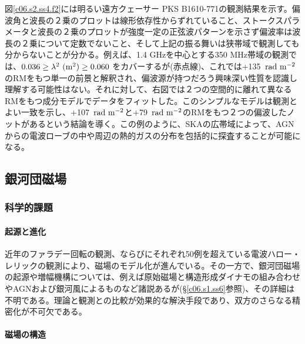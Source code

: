 図\ref{c06.s2.ss4.f2}には明るい遠方クェーサー PKS B1610-771の観測結果を示す\citep{2012MNRAS.421.3300O}。偏波角と波長の２乗のプロットは線形依存性からずれていること、ストークスパラメータと波長の２乗のプロットが強度一定の正弦波パターンを示さず偏波率は波長の２乗について定数でないこと、そして上記の振る舞いは狭帯域で観測しても分からないことが分かる。例えば、1.4 GHzを中心とする350 MHz帯域の観測\citep{2004NewAR..48.1003G, 2004NewAR..48.1289B}では、$0.036 \ge \lambda^2~({\rm m^2}) \ge 0.060$ をカバーするが(赤点線)、これでは+135~${\rm rad~m^{-2}}$のRMをもつ単一の前景と解釈され、偏波源が持つだろう興味深い性質を認識し理解する可能性はない。それに対して、右図では２つの空間的に離れて異なるRMをもつ成分モデルでデータをフィットした。このシンプルなモデルは観測とよい一致を示し、+107~${\rm rad~m^{-2}}$と+79~${\rm rad~m^{-2}}$のRMをもつ２つの偏波したノットがあるという結論を導く。この例のように、SKAの広帯域によって、AGNからの電波ローブの中や周辺の熱的ガスの分布を包括的に探査することが可能になる。


\subsection{銀河団磁場}
\label{c06.s2.ss5}

\subsubsection{科学的課題}
\label{c06.s2.ss5.sss1}

\paragraph{起源と進化}

近年のファラデー回転の観測、ならびにそれぞれ50例を超えている電波ハロー・レリックの観測により、磁場のモデル化が進んでいる。その一方で、銀河団磁場の起源や増幅機構については、例えば原始磁場と構造形成ダイナモの組み合わせ\citep{2008Sci...320..909R}やAGNおよび銀河風\citep{2000ApJ...541...88V}によるものなど諸説あるが(\S \ref{c06.s1.ss6}参照)、その詳細は不明である。理論と観測との比較が効果的な解決手段であり、双方のさらなる精密化が不可欠である。

\paragraph{磁場の構造}

